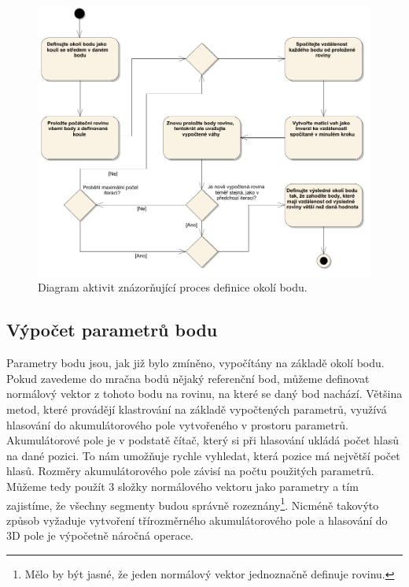 \documentclass[11pt,twoside,a4paper]{book}
\begin{document}
\begin{figure}[ht]
\begin{center}
\includegraphics[width=\textwidth]{figures/okoli-diagram}
\caption{Diagram aktivit znázorňující proces definice okolí bodu.}
\label{fig:diagram-okoli}
\end{center}
\end{figure}

\newpage
\subsection{Výpočet parametrů bodu}

Parametry bodu jsou, jak již bylo zmíněno, vypočítány na základě okolí bodu. Pokud zavedeme do mračna bodů nějaký referenční bod, můžeme definovat normálový vektor z tohoto bodu na rovinu, na které se daný bod nachází. Většina metod, které provádějí klastrování na základě vypočtených parametrů, využívá hlasování do akumulátorového pole vytvořeného v prostoru parametrů. Akumulátorové pole je v podstatě čítač, který si při hlasování ukládá počet hlasů na dané pozici. To nám umožňuje rychle vyhledat, která pozice má největší počet hlasů. Rozměry akumulátorového pole závisí na počtu použitých parametrů. Můžeme tedy použít 3 složky normálového vektoru jako parametry a tím zajistíme, že všechny segmenty budou správně rozeznány\footnote{Mělo by být jasné, že jeden normálový vektor jednoznačně definuje rovinu.}. Nicméně takovýto způsob vyžaduje vytvoření třírozměrného akumulátorového pole a hlasování do 3D pole je výpočetně náročná operace. 
\end{document}
